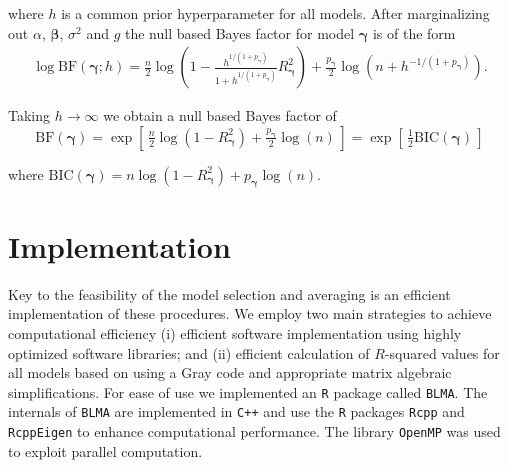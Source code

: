 \documentclass[12pt]{article}
\def\vectorfontone{\bf}
\def\vectorfonttwo{\boldsymbol}
\def\vy{{\vectorfontone y}}                      %
\def\vbeta{{\vectorfonttwo \beta}}               %
\def\vgamma{{\vectorfonttwo \gamma}}             %
\def\matrixfontone{\bf}
\def\mX{{\matrixfontone X}}                      %
\def\ds{\displaystyle}
\begin{document}
\noindent where $h$ is a common prior hyperparameter for all models. After marginalizing
out $\alpha$, $\vbeta$, $\sigma^2$ and $g$ the null based Bayes factor 
for model $\vgamma$ is of the form
$$
\begin{array}{rl}
\ds \log\mbox{BF}(\vgamma;h)
=
\tfrac{n}{2}\log\left( 1 - \tfrac{h^{1/(1+p_\vgamma)}}{1+h^{1/(1+p_\vgamma)}} R_\vgamma^2 \right) 
+ \tfrac{p_\vgamma}{2}\log\left(n + h^{-1/(1+p_\vgamma)} \right).
\end{array}
$$

\noindent Taking $h\to\infty$ we obtain a null based Bayes factor of
\begin{equation}\label{eq:marginalLikelihoodCake}
\ds \mbox{BF}(\vgamma)
=
\exp\left[ \,
\tfrac{n}{2}\log\left( 1 - R_\vgamma^2 \right) 
+ \tfrac{p_\vgamma}{2}\log\left(n \right) \,
\right] = \exp\left[ \, \tfrac{1}{2}\mbox{BIC}(\vgamma) \,\right]
\end{equation}

\noindent where $\mbox{BIC}(\vgamma) = n\log\left( 1 - R_\vgamma^2 \right) + p_\vgamma \log(n)$. 


 
\section{Implementation}
\label{sec:implementation}

Key to the feasibility of the model selection and averaging is an efficient implementation of these procedures. We employ two main 
strategies to achieve computational efficiency (i) efficient software implementation using
highly optimized software libraries; and (ii) efficient calculation of
$R$-squared values for all models based on using a Gray code and appropriate
matrix algebraic simplifications.
For ease of use we 
implemented an {\tt R} package called {\tt BLMA}.
The internals of {\tt BLMA} are implemented
in {\tt C++} and use the {\tt R} packages \texttt{Rcpp} and \texttt{RcppEigen} to enhance
computational performance. The library {\tt OpenMP} was used to
exploit parallel computation.
\end{document}
